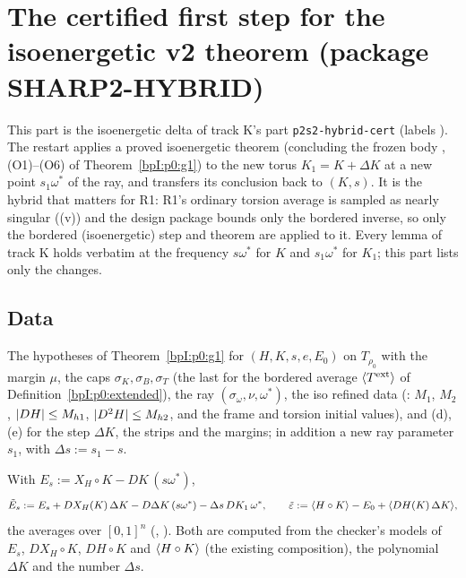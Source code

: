 \sloppy
\section{The certified first step for the isoenergetic v2 theorem (package SHARP2-HYBRID)}\label{bpI:p2s2hc}

This part is the isoenergetic delta of track K's part \texttt{p2s2-hybrid-cert} (labels ). The restart applies a proved
isoenergetic theorem (concluding the frozen body , (O1)--(O6) of Theorem~\ref{bpI:p0:g1}) to the new torus $K_1=K+\Delta K$ at a new point
$s_1\omega^*$ of the ray, and transfers its conclusion back to $(K,s)$. It is the hybrid that matters for R1: R1's ordinary torsion average is
sampled as nearly singular ((v)) and the design package bounds only the bordered inverse, so only the bordered
(isoenergetic) step and theorem are applied to it. Every lemma of track K holds verbatim at
the frequency $s\omega^*$ for $K$ and $s_1\omega^*$ for $K_1$; this part lists only the changes.

\subsection{Data}\label{bpI:p2s2hc:sec-data}

\begin{assumption}\label{bpI:p2s2hc:standing}
The hypotheses of Theorem~\ref{bpI:p0:g1} for $(H,K,s,e,E_0)$ on $T_{\rho_0}$ with the margin $\mu$, the caps $\sigma_K,\sigma_B,\sigma_T$ (the last for the bordered
average $\langle T^{\mathrm{ext}}\rangle$ of Definition~\ref{bpI:p0:extended}), the ray $(\sigma_\omega,\nu,\omega^*)$, the iso refined data (: $M_1$, $M_2$,
$\lvert DH\rvert\le M_{h1}$, $\lvert D^2H\rvert\le M_{h2}$, and the frame and torsion initial values), and (d), (e) for the step $\Delta K$, the strips and
the margins; in addition a new ray parameter $s_1$, with $\Delta s:=s_1-s$.
\end{assumption}

\begin{definition}\label{bpI:p2s2hc:lin}
With $E_s:=X_H\circ K-DK\,(s\omega^*)$,
\[
\tilde E_s:=E_s+DX_H(K)\,\Delta K-D\Delta K\,(s\omega^*)-\Delta s\,DK_1\,\omega^*,\qquad
\tilde\varepsilon:=\langle H\circ K\rangle-E_0+\langle DH(K)\,\Delta K\rangle,
\]
the averages over $[0,1]^n$ (, ). Both are computed from the checker's models of
$E_s$, $DX_H\circ K$, $DH\circ K$ and $\langle H\circ K\rangle$ (the existing composition), the polynomial $\Delta K$ and the number $\Delta s$.
\end{definition}


